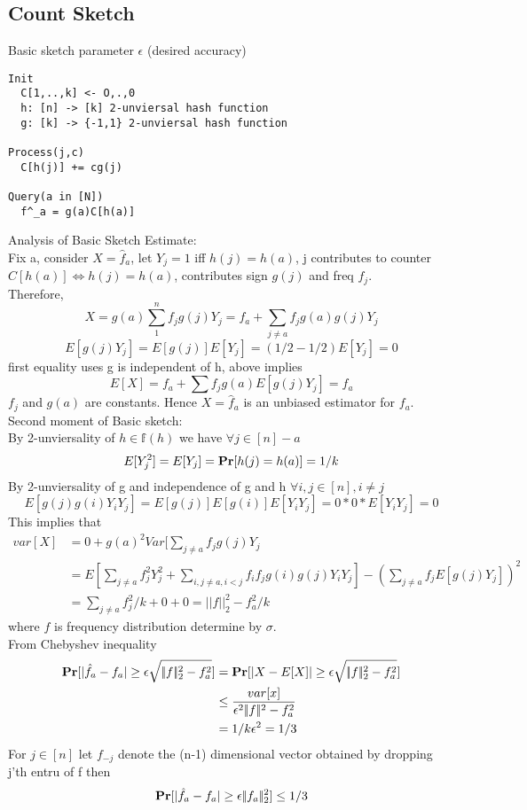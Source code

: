 \documentclass[a4paper]{article}
\def\Pr{\mbox{\textbf{Pr}}}
\begin{document}
\subsection{Count Sketch}
Basic sketch parameter \(\epsilon\) (desired accuracy)
\begin{verbatim}
Init
  C[1,..,k] <- O,.,0
  h: [n] -> [k] 2-unviersal hash function
  g: [k] -> {-1,1} 2-unviersal hash function

Process(j,c)
  C[h(j)] += cg(j)

Query(a in [N])
  f^_a = g(a)C[h(a)]
\end{verbatim}
Analysis of Basic Sketch Estimate:\\
Fix a, consider \(X=\hat{f}_a\), let \(Y_j=1\) iff \(h(j)=h(a)\), j contributes to counter \(C[h(a)] \Leftrightarrow h(j)=h(a)\), contributes sign \(g(j)\) and freq \(f_j\).\\
Therefore,
\[X = g(a)\sum_1^n f_jg(j)Y_j = f_a + \sum_{j\neq a} f_j g(a)g(j)Y_j\]
\[E[g(j)Y_j] = E[g(j)]E[Y_j] = (1/2-1/2)E[Y_j] = 0\]
first equality uses g is independent of h, above implies
\[E[X]=f_a + \sum f_j g(a) E[g(j)Y_j] = f_a\]
\(f_j\) and \(g(a)\) are constants. Hence \(X=\hat{f}_a\) is an unbiased estimator for \(f_a\).\\
Second moment of Basic sketch:\\
By 2-unviersality of \(h\in \mathbb{f}(h)\) we have \(\forall j \in [n] - a\)
\[E[Y_j^2] = E[Y_j] = \Pr[h(j)=h(a)] = 1/k\]
By 2-unviersality of g and independence of g and h \(\forall i,j\in [n], i\neq j\)
\[E[g(j)g(i)Y_iY_j] = E[g(j)]E[g(i)]E[Y_iY_j] = 0*0*E[Y_i Y_j] = 0\]
This implies that
\begin{align}
var[X] &= 0 + g(a)^2Var[\sum_{j\neq a} f_j g(j) Y_j\\
       &= E[\sum_{j\neq a} f_j^2 Y_j^2 + \sum_{i,j \neq a, i<j} f_if_jg(i)g(j)Y_iY_j] - (\sum_{j\neq a} f_j E[g(j) Y_j])^2\\
       &= \sum_{j\neq a} f_j^2/k + 0 + 0 = |\!|f|\!|^2_2 - f_a^2/k
\end{align}
where \(f\) is frequency distribution determine by \(\sigma\).\\
From Chebyshev inequality
\begin{align}
\Pr[|\hat{f}_a-f_a| \geq \epsilon \sqrt{|\!| f|\!|_2^2 - f_a^2}] &= \Pr[|X-E[X]| \geq \epsilon \sqrt{|\!| f|\!|_2^2 - f_a^2}]\\
                                                                &\leq \frac{var[x]}{\epsilon^2|\!|f|\!|^2-f_a^2}\\
                                                                &= 1/k\epsilon^2 = 1/3
\end{align}
For  \(j \in [n]\) let \(f_{-j}\)  denote the (n-1) dimensional vector obtained by dropping j'th entru of f then
\[\Pr[|\hat{f}_a -f_a| \geq \epsilon|\!|f_{a}|\!|^2_2] \leq 1/3\]
\end{document}
